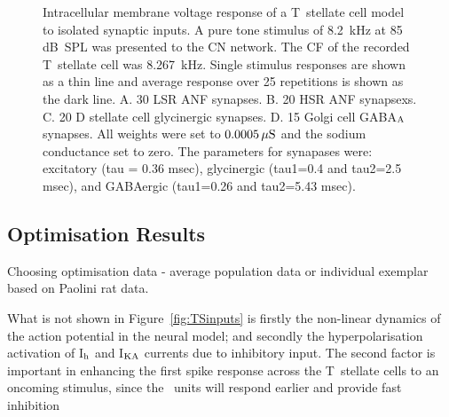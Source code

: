 \begin{figure}[htb]
  \centering
\caption[Response of T~stellate cells to isolated synaptic
  inputs]{Intracellular membrane voltage response of a T~stellate cell model to
    isolated synaptic inputs. A pure tone stimulus of 8.2~kHz at 85 dB~SPL was
    presented to the CN network. The CF of the recorded T~stellate cell was
    8.267~kHz.  Single stimulus responses are shown as a thin line and average
    response over 25 repetitions is shown as the dark line. A. 30 LSR ANF
    synapses. B. 20 HSR ANF synapsexs. C. 20 D stellate cell glycinergic
    synapses. D. 15 Golgi cell GABA$_{\rm A}$ synapses. All weights were set to
    $0.0005\,\mu{\rm S}$ and the sodium conductance set to zero.  The parameters
    for synapases were: excitatory (tau = 0.36 msec), glycinergic (tau1=0.4 and
    tau2=2.5 msec), and GABAergic (tau1=0.26 and tau2=5.43
    msec).\label{fig:TSExcinputs}}
\end{figure}





\subsection{Optimisation Results}

Choosing optimisation data - average population data or individual exemplar based on Paolini rat data.


What is not shown in Figure~\ref{fig:TSinputs} is firstly the non-linear
dynamics of the action potential in the neural model; and secondly the
hyperpolarisation activation of I$_{\rm h}$ and I$_{\rm KA}$ currents due to inhibitory
input.  The second factor is important in enhancing the first spike response
across the T~stellate cells \citep{PaoliniClareyEtAl:2004}to an oncoming
stimulus, since the \OnC~units will respond earlier and provide fast inhibition 





